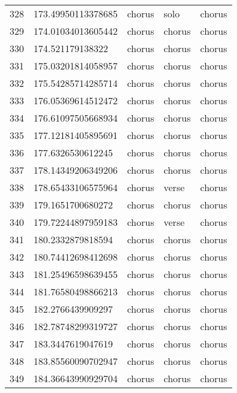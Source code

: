 \begin{table}[]
\begin{tabular}{lllll}
    328  & 173.49950113378685 & chorus       & solo            & chorus         \\
    329  & 174.01034013605442 & chorus       & chorus          & chorus         \\
    330  & 174.521179138322   & chorus       & chorus          & chorus         \\
    331  & 175.03201814058957 & chorus       & chorus          & chorus         \\
    332  & 175.54285714285714 & chorus       & chorus          & chorus         \\
    333  & 176.05369614512472 & chorus       & chorus          & chorus         \\
    334  & 176.61097505668934 & chorus       & chorus          & chorus         \\
    335  & 177.12181405895691 & chorus       & chorus          & chorus         \\
    336  & 177.6326530612245  & chorus       & chorus          & chorus         \\
    337  & 178.14349206349206 & chorus       & chorus          & chorus         \\
    338  & 178.65433106575964 & chorus       & verse           & chorus         \\
    339  & 179.1651700680272  & chorus       & chorus          & chorus         \\
    340  & 179.72244897959183 & chorus       & verse           & chorus         \\
    341  & 180.2332879818594  & chorus       & chorus          & chorus         \\
    342  & 180.74412698412698 & chorus       & chorus          & chorus         \\
    343  & 181.25496598639455 & chorus       & chorus          & chorus         \\
    344  & 181.76580498866213 & chorus       & chorus          & chorus         \\
    345  & 182.2766439909297  & chorus       & chorus          & chorus         \\
    346  & 182.78748299319727 & chorus       & chorus          & chorus         \\
    347  & 183.3447619047619  & chorus       & chorus          & chorus         \\
    348  & 183.85560090702947 & chorus       & chorus          & chorus         \\
    349  & 184.36643990929704 & chorus       & chorus          & chorus         \\

\end{tabular}
\end{table}
